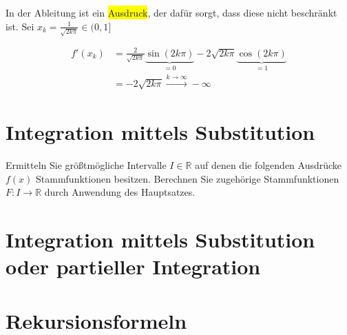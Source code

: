 \documentclass{article}
\begin{document}
\begin{enumerate}[a)]
  In der Ableitung ist ein \colorbox{yellow}{Ausdruck}, der dafür sorgt, dass diese nicht beschränkt ist.
  Sei $x_k = \frac{1}{\sqrt{2k\pi}} \in (0, 1]$

  \begin{align*}
    f'(x_k) &= \frac{2}{\sqrt{2k\pi}} \underset{= 0}{\underbrace{\sin(2k\pi)}} - 2 \sqrt{2k\pi} \underset{= 1}{\underbrace{\cos(2k\pi)}} \\
            &= - 2 \sqrt{2k\pi} \overset{k \to \infty}{\longrightarrow} -\infty
  \end{align*}
  
\end{enumerate}

\section*{Integration mittels Substitution}

Ermitteln Sie größtmögliche Intervalle $I \in \mathbb{R}$ auf denen die
folgenden Ausdrücke $f(x)$ Stammfunktionen besitzen.
Berechnen Sie zugehörige Stammfunktionen $F \colon I \to \mathbb{R}$
durch Anwendung des Hauptsatzes.

\section*{Integration mittels Substitution oder partieller Integration}

\section*{Rekursionsformeln}
\end{document}
